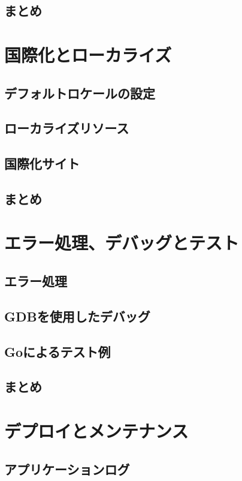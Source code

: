 \subsection{まとめ}

\section{国際化とローカライズ}

\subsection{デフォルトロケールの設定}

\subsection{ローカライズリソース}

\subsection{国際化サイト}

\subsection{まとめ}


\section{エラー処理、デバッグとテスト}

\subsection{エラー処理}

\subsection{GDBを使用したデバッグ}

\subsection{Goによるテスト例}

\subsection{まとめ}


\section{デプロイとメンテナンス}

\subsection{アプリケーションログ}

